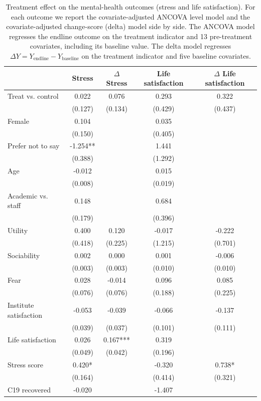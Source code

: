 \begin{table}
\centering
\caption{Treatment effect on the mental-health outcomes (stress and life satisfaction). For each outcome we report the covariate-adjusted ANCOVA level model and the covariate-adjusted change-score (delta) model side by side. The ANCOVA model regresses the endline outcome on the treatment indicator and 13 pre-treatment covariates, including its baseline value. The delta model regresses $\Delta Y = Y_{\text{endline}} - Y_{\text{baseline}}$ on the treatment indicator and five baseline covariates.\label{tab:results-mentalhealth}}
\centering
\begin{tabular}[t]{lcccc}
\toprule
  & Stress & $\Delta$ Stress & Life satisfaction & $\Delta$ Life satisfaction\\
\midrule
Treat vs. control & 0.022 & 0.076 & 0.293 & 0.322\\
 & (0.127) & (0.134) & (0.429) & (0.437)\\
Female & 0.104 &  & 0.035 & \\
 & (0.150) &  & (0.405) & \\
Prefer not to say & -1.254** &  & 1.441 & \\
 & (0.388) &  & (1.292) & \\
Age & -0.012 &  & 0.015 & \\
 & (0.008) &  & (0.019) & \\
Academic vs. staff & 0.148 &  & 0.684 & \\
 & (0.179) &  & (0.396) & \\
Utility & 0.400 & 0.120 & -0.017 & -0.222\\
 & (0.418) & (0.225) & (1.215) & (0.701)\\
Sociability & 0.002 & 0.000 & 0.001 & -0.006\\
 & (0.003) & (0.003) & (0.010) & (0.010)\\
Fear & 0.028 & -0.014 & 0.096 & 0.085\\
 & (0.076) & (0.076) & (0.188) & (0.225)\\
Institute satisfaction & -0.053 & -0.039 & -0.066 & -0.137\\
 & (0.039) & (0.037) & (0.101) & (0.111)\\
Life satisfaction & 0.026 & 0.167*** & 0.319 & \\
 & (0.049) & (0.042) & (0.196) & \\
Stress score & 0.420* &  & -0.320 & 0.738*\\
 & (0.164) &  & (0.414) & (0.321)\\
C19 recovered & -0.020 &  & -1.407 & \\

\end{tabular}
\end{table}

